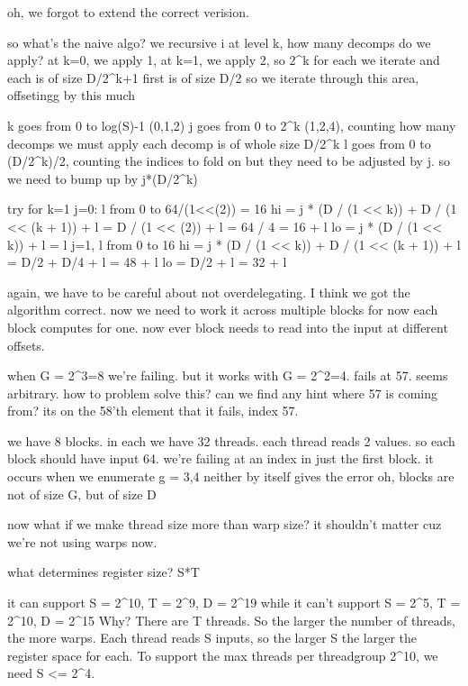 oh, we forgot to extend the correct verision.

so what's the naive algo?
we recursive i
at level k, how many decomps do we apply?
at k=0, we apply 1, at k=1, we apply 2, so 2^k
for each we iterate and each is of size D/2^{k+1}
first is of size D/2
so we iterate through this area, offsetingg by this much

k goes from 0 to log(S)-1 (0,1,2)
j goes from 0 to 2^k (1,2,4), counting how many decomps we must apply
each decomp is of whole size D/2^k
l goes from 0 to (D/2^k)/2, counting the indices to fold on
but they need to be adjusted by j. so we need to bump up by j*(D/2^k)

try for k=1
j=0: l from 0 to 64/(1<<(2)) = 16
    hi = j * (D / (1 << k)) + D / (1 << (k + 1)) + l
        = D / (1 << (2)) + l = 64 / 4 = 16 + l
    lo = j * (D / (1 << k)) + l
        = l
j=1, l from 0 to 16
    hi = j * (D / (1 << k)) + D / (1 << (k + 1)) + l
        = D/2 + D/4 + l = 48 + l
    lo = D/2 + l = 32 + l

again, we have to be careful about not overdelegating.
I think we got the algorithm correct. now we need to work it across multiple blocks
for now each block computes for one.
now ever block needs to read into the input at different offsets. 

when G = 2^3=8 we're failing. 
but it works with G = 2^2=4.
fails at 57. seems arbitrary.
how to problem solve this?
can we find any hint where 57 is coming from? its on the 58'th element that it fails, index 57.

we have 8 blocks. in each we have 32 threads. each thread reads 2 values.
so each block should have input 64.
we're failing at an index in just the first block.
it occurs when we enumerate g = 3,4
neither by itself gives the error
oh, blocks are not of size G, but of size D

now what if we make thread size more than warp size?
it shouldn't matter cuz we're not using warps now.

what determines register size? S*T

it can support S = 2^10, T = 2^9, D = 2^19
while it can't support S = 2^5, T = 2^10, D = 2^15
Why?
There are T threads. So the larger the number of threads, the more warps.
Each thread reads S inputs, so the larger S the larger the register space for each.
To support the max threads per threadgroup 2^10, we need S <= 2^4.




















